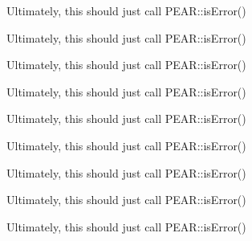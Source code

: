
\begin{DoxyRefList}
\item[\label{todo__todo000001}%
\hypertarget{todo__todo000001}{}%
Global \hyperlink{class_services___j_s_o_n_a55ae0955466c3970507b122f3f5d1b38}{Services\-\_\-\-J\-S\-O\-N\-:\-:is\-Error} (\$data, \$code=null)]Ultimately, this should just call P\-E\-A\-R\-::is\-Error() 

Ultimately, this should just call P\-E\-A\-R\-::is\-Error() 

Ultimately, this should just call P\-E\-A\-R\-::is\-Error() 

Ultimately, this should just call P\-E\-A\-R\-::is\-Error() 

Ultimately, this should just call P\-E\-A\-R\-::is\-Error() 

Ultimately, this should just call P\-E\-A\-R\-::is\-Error() 

Ultimately, this should just call P\-E\-A\-R\-::is\-Error() 

Ultimately, this should just call P\-E\-A\-R\-::is\-Error() 

Ultimately, this should just call P\-E\-A\-R\-::is\-Error() 
\end{DoxyRefList}